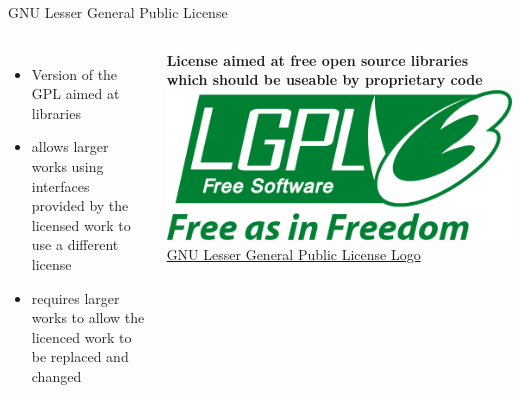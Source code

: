\documentclass[10pt, graphics, aspectratio=169, table]{beamer}
\begin{document}
    \begin{frame}{GNU Lesser General Public License}
        \begin{columns}
                \begin{itemize}
                    \item Version of the GPL aimed at libraries
                    \item allows larger works using interfaces provided by the licensed work to use a different license
                    \item requires larger works to allow the licenced work to be replaced and changed
                \end{itemize}
                \textbf{License aimed at free open source libraries which should be useable by proprietary code}
                \includegraphics[width=\textwidth]{img/LGPL.png}
                \center\tiny\href{https://commons.wikimedia.org/wiki/File:LGPLv3_Logo.svg}{GNU Lesser General Public License Logo}
        \end{columns}
    \end{frame}
\end{document}
